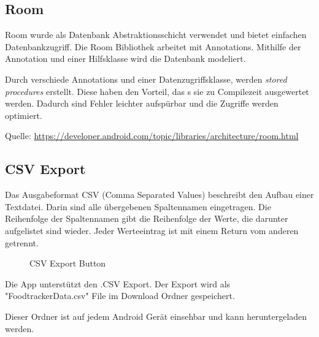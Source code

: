 \documentclass[
    DIV12,
    cleardouble=plain,
    headings=normal,
    pdftex,
    headexclude,footexclude,
    final
]{scrreprt}
\begin{document}
\subsection{Room}
Room wurde als Datenbank Abstraktionsschicht verwendet und bietet einfachen Datenbankzugriff. Die Room Bibliothek arbeitet mit Annotations. Mithilfe der Annotation und einer Hilfsklasse wird die Datenbank modeliert. 

\newpage

Durch verschiede Annotations und einer Datenzugriffsklasse, werden \textit{stored procedures} erstellt.
Diese haben den Vorteil, das	s sie zu Compilezeit ausgewertet werden. Dadurch sind Fehler leichter aufspürbar und die Zugriffe werden optimiert.




Quelle:
\url{https://developer.android.com/topic/libraries/architecture/room.html}


\subsection{CSV Export}
Das Ausgabeformat CSV (Comma Separated Values) beschreibt den Aufbau einer Textdatei. Darin sind alle übergebenen Spaltennamen eingetragen. Die Reihenfolge der Spaltennamen gibt die Reihenfolge der Werte, die darunter aufgelistet sind wieder. Jeder Werteeintrag ist mit einem Return vom anderen getrennt.\\

\begin{figure}[H]
	\centering
	\caption{CSV Export Button}
	\label{csv_button}
\end{figure}

Die App unterstützt den .CSV Export. Der Export wird als "FoodtrackerData.csv" File im Download Ordner gespeichert.



Dieser Ordner ist auf jedem Android Gerät einsehbar und kann heruntergeladen werden.
\end{document}
